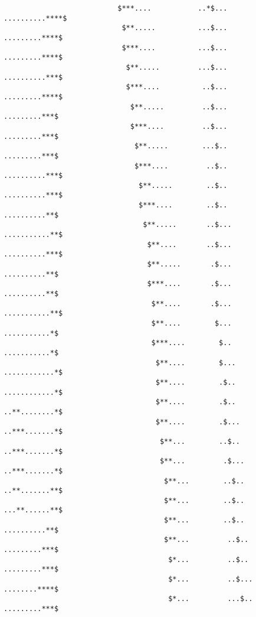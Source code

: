 \begin{verbatim}
                           $***....           ..*$...                    ..........****$
                            $**.....          ...$...                    .........****$
                            $***....          ...$...                    .........****$
                             $**.....         ...$...                   ..........***$
                             $***....          ..$...                   .........****$
                              $**.....         ..$...                   .........***$
                              $***....         ..$...                   .........***$
                               $**.....        ...$..                  .........***$
                               $***....         ..$..                 ..........***$
                                $**.....        ..$..                 ..........***$
                                $***....        ..$..                 ..........**$
                                 $**.....       ..$...               ...........**$
                                  $**....       ..$...               ..........***$
                                  $**.....       .$...               ..........**$
                                  $***....       .$...               ..........**$
                                   $**....       .$...              ...........**$
                                   $**....        $...              ...........*$
                                   $***....        $..              ...........*$
                                    $**....        $...            ............*$
                                    $**....        .$..            ............*$
                                    $**....        .$..            ..**........*$
                                    $**....        .$...           ..***.......*$
                                     $**...        ..$..           ..***.......*$
                                     $**...         .$...          ..***.......*$
                                      $**...        ..$..           ..**.......**$
                                      $**...        ..$..           ...**......**$
                                      $**...        ..$..            ..........**$
                                      $**...         ..$..            .........***$
                                       $*...         ..$..            .........***$
                                       $*...         ..$...            ........****$
                                       $*...         ...$..            .........***$

\end{verbatim}
